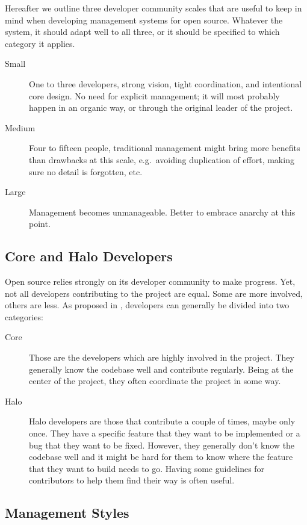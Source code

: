 Hereafter we outline three developer community scales that are useful to keep in mind when developing management systems for open source.
Whatever the system, it should adapt well to all three, or it should be specified to which category it applies.

\begin{description}
  \item[Small]
    One to three developers, strong vision, tight coordination, and intentional core design.
    No need for explicit management; it will most probably happen in an organic way, or through the original leader of the project.
  \item[Medium]
    Four to fifteen people, traditional management might bring more benefits than drawbacks at this scale, e.g.\ avoiding duplication of effort, making sure no detail is forgotten, etc.
  \item[Large]
    Management becomes unmanageable.
    Better to embrace anarchy at this point.
\end{description}

\subsection{Core and Halo Developers}

Open source relies strongly on its developer community to make progress.
Yet, not all developers contributing to the project are equal.
Some are more involved, others are less.
As proposed in , developers can generally be divided into two categories:

\begin{description}
  \item[Core]
  	Those are the developers which are highly involved in the project.
  	They generally know the codebase well and contribute regularly.
  	Being at the center of the project, they often coordinate the project in some way.
  \item[Halo]
  	Halo developers are those that contribute a couple of times, maybe only once.
  	They have a specific feature that they want to be implemented or a bug that they want to be fixed.
  	However, they generally don't know the codebase well and it might be hard for them to know where the feature that they want to build needs to go.
  	Having some guidelines for contributors to help them find their way is often useful.
\end{description}

\subsection{Management Styles}

